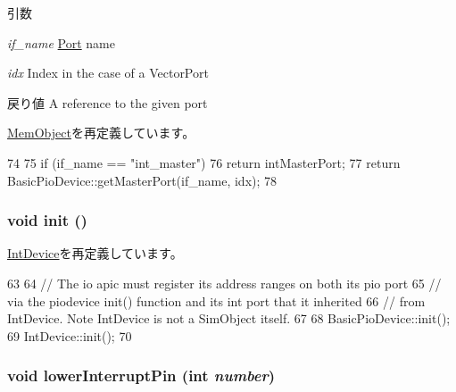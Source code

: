 \begin{DoxyParams}{引数}
\item[{\em if\_\-name}]\hyperlink{classPort}{Port} name \item[{\em idx}]Index in the case of a VectorPort\end{DoxyParams}
\begin{DoxyReturn}{戻り値}
A reference to the given port 
\end{DoxyReturn}


\hyperlink{classMemObject_adc4e675e51defbdd1e354dac729d0703}{MemObject}を再定義しています。


\begin{DoxyCode}
74 {
75     if (if_name == "int_master")
76         return intMasterPort;
77     return BasicPioDevice::getMasterPort(if_name, idx);
78 }
\end{DoxyCode}
\hypertarget{classX86ISA_1_1I82094AA_a02fd73d861ef2e4aabb38c0c9ff82947}{
\subsubsection[{init}]{\setlength{\rightskip}{0pt plus 5cm}void init ()}}
\label{classX86ISA_1_1I82094AA_a02fd73d861ef2e4aabb38c0c9ff82947}


\hyperlink{classX86ISA_1_1IntDevice_a02fd73d861ef2e4aabb38c0c9ff82947}{IntDevice}を再定義しています。


\begin{DoxyCode}
63 {
64     // The io apic must register its address ranges on both its pio port
65     // via the piodevice init() function and its int port that it inherited
66     // from IntDevice.  Note IntDevice is not a SimObject itself.
67 
68     BasicPioDevice::init();
69     IntDevice::init();
70 }
\end{DoxyCode}
\hypertarget{classX86ISA_1_1I82094AA_a41406df644356ee1578b77b1acd18042}{
\subsubsection[{lowerInterruptPin}]{\setlength{\rightskip}{0pt plus 5cm}void lowerInterruptPin (int {\em number})}}
\label{classX86ISA_1_1I82094AA_a41406df644356ee1578b77b1acd18042}


